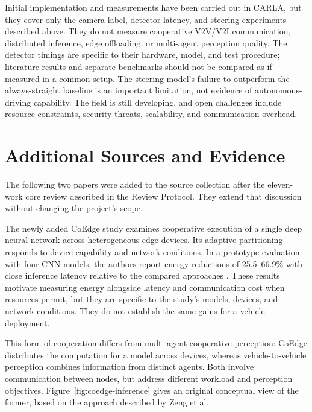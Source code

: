\documentclass[12pt,a4paper,oneside]{report}
\begin{document}
Initial implementation and measurements have been carried out in CARLA, but
they cover only the camera-label, detector-latency, and steering experiments
described above. They do not measure cooperative V2V/V2I communication,
distributed inference, edge offloading, or multi-agent perception quality.
The detector timings are specific to their hardware, model, and test
procedure; literature results and separate benchmarks should not be
compared as if measured in a common setup. The steering model's failure to
outperform the always-straight baseline is an important limitation, not
evidence of autonomous-driving capability. The field is still developing,
and open challenges include resource constraints, security threats,
scalability, and communication overhead.

\section{Additional Sources and Evidence}

The following two papers were added to the source collection after the
eleven-work core review described in the Review Protocol. They extend that
discussion without changing the project's scope.

The newly added CoEdge study examines cooperative execution of a single
deep neural network across heterogeneous edge devices. Its adaptive
partitioning responds to device capability and network conditions. In a
prototype evaluation with four CNN models, the authors report energy
reductions of 25.5--66.9\% with close inference latency relative to the
compared approaches \cite{coedge2021}. These results motivate measuring
energy alongside latency and communication cost when resources permit, but
they are specific to the study's models, devices, and network conditions.
They do not establish the same gains for a vehicle deployment.

This form of cooperation differs from multi-agent cooperative perception:
CoEdge distributes the computation for a model across devices, whereas
vehicle-to-vehicle perception combines information from distinct agents.
Both involve communication between nodes, but address different workload
and perception objectives. Figure~\ref{fig:coedge-inference} gives an
original conceptual view of the former, based on the approach described by
Zeng et al.\ \cite{coedge2021}.
\end{document}
